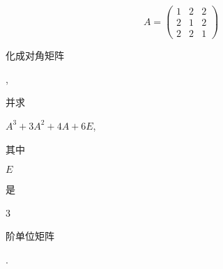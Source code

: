 \documentclass[10pt]{article}
\begin{document}
$$
A=\left(\begin{array}{lll}
1 & 2 & 2 \\
2 & 1 & 2 \\
2 & 2 & 1
\end{array}\right)
$$
\begin{CJK}{UTF8}{mj}化成对角矩阵\end{CJK}, \begin{CJK}{UTF8}{mj}并求\end{CJK} $A^{3}+3 A^{2}+4 A+6 E$, \begin{CJK}{UTF8}{mj}其中\end{CJK} $E$ \begin{CJK}{UTF8}{mj}是\end{CJK} 3 \begin{CJK}{UTF8}{mj}阶单位矩阵\end{CJK}.
\end{document}
